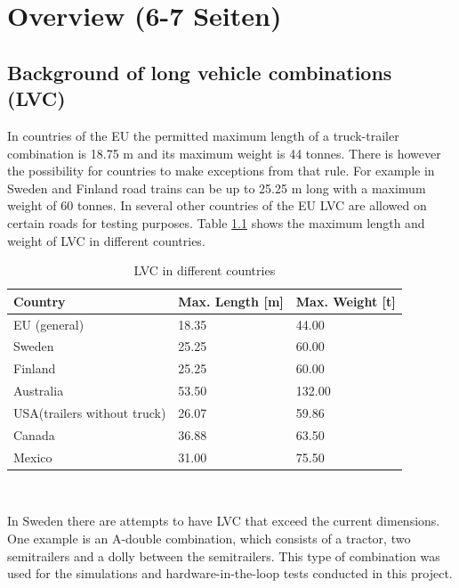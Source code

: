 \documentclass[ExampleMasters.tex]{subfiles}
\begin{document}
\clearpage
\chapter{Overview (6-7 Seiten)}
\label{chap:overview}


\section{Background of long vehicle combinations (LVC)}
\label{sec:legal_situation}

In countries of the EU the permitted maximum length of a truck-trailer combination is 18.75 m and its maximum weight is 44 tonnes. There is however the possibility for countries to make exceptions from that rule.\cite{96/53/EC}  For example in Sweden and Finland road trains can be up to 25.25 m long with a  maximum weight of 60 tonnes.\cite{Vaegverket}
In several other countries of the EU LVC are allowed on certain roads for testing purposes. 
Table \ref{tab:LVC_in_different_countries} shows the maximum length and weight of LVC in different countries.

\begin{table}[h]
	\centering
	\caption{LVC in different countries\cite{Vaegverket}\cite{LVC_Australia}\Cite{LVC_USA}\cite{LVC_Canada}\Cite{LVC_Mexico}}
	\label{tab:LVC_in_different_countries}
	\begin{tabular}{l|l|l|}
		Country   & Max. Length [m] & Max. Weight [t] \\ \hline
		EU (general) & 18.35 & 44.00\\
		Sweden    &       25.25      &       60.00      \\
		Finland   &            25.25 &         60.00    \\
		Australia &      53.50       &           132.00  \\
		USA(trailers without truck)&      26.07       &    59.86        \\
		Canada & 36.88 & 63.50 \\
		Mexico & 31.00 & 75.50 \\
	\end{tabular} \\
\end{table}
In Sweden there are attempts to have LVC that exceed the current dimensions. One example is an A-double combination, which consists of a tractor, two semitrailers and a dolly between the semitrailers. This type of combination was used for the simulations and hardware-in-the-loop tests conducted in this project.\\
\end{document}
